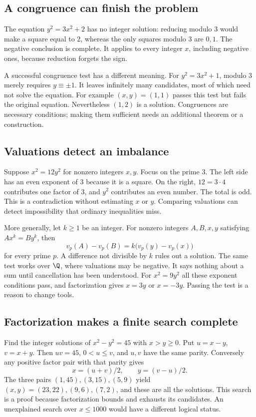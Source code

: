 \subsection*{A congruence can finish the problem}
The equation $y^2=3x^2+2$ has no integer solution: reducing modulo $3$
would make a square equal to $2$, whereas the only squares modulo $3$ are
$0,1$. The negative conclusion is complete. It applies to every integer
$x$, including negative ones, because reduction forgets the sign.

A successful congruence test has a different meaning. For $y^2=3x^2+1$,
modulo $3$ merely requires $y\equiv\pm1$. It leaves infinitely many
candidates, most of which need not solve the equation. For example $(x,y)=(1,1)$
passes this test but fails the original equation. Nevertheless $(1,2)$ is a
solution. Congruences are necessary conditions; making them sufficient needs
an additional theorem or a construction.

\subsection*{Valuations detect an imbalance}
Suppose $x^2=12y^2$ for nonzero integers $x,y$. Focus on the prime $3$. The left side has an even exponent of $3$ because it is a square. On the right, $12=3\cdot4$ contributes one factor of $3$, and $y^2$ contributes an even number. The total is odd. This is a contradiction without estimating $x$ or $y$. Comparing valuations can detect impossibility that ordinary inequalities miss.

More generally, let $k\ge1$ be an integer. For nonzero integers $A,B,x,y$ satisfying $Ax^k=By^k$, then
\[
v_p(A)-v_p(B)=k\bigl(v_p(y)-v_p(x)\bigr)
\]
for every prime $p$. A difference not divisible by $k$ rules out a solution.
The same test works over $\Q$, where valuations may be negative.
It says nothing about a sum until cancellation has been understood.
For $x^2=9y^2$ all these exponent conditions pass, and factorization gives
$x=3y$ or $x=-3y$. Passing the test is a reason to change tools.

\subsection*{Factorization makes a finite search complete}
Find the integer solutions of $x^2-y^2=45$ with $x>y\ge0$. Put
$u=x-y$, $v=x+y$. Then $uv=45$, $0<u\le v$, and $u,v$ have the same parity.
Conversely any positive factor pair with that parity gives
\[
x=(u+v)/2,\qquad y=(v-u)/2.
\]
The three pairs $(1,45),(3,15),(5,9)$ yield
$(x,y)=(23,22),(9,6),(7,2)$, and these are all the solutions.
This search is a proof because factorization bounds and exhausts its candidates.
An unexplained search over $x\le1000$ would have a different logical status.

